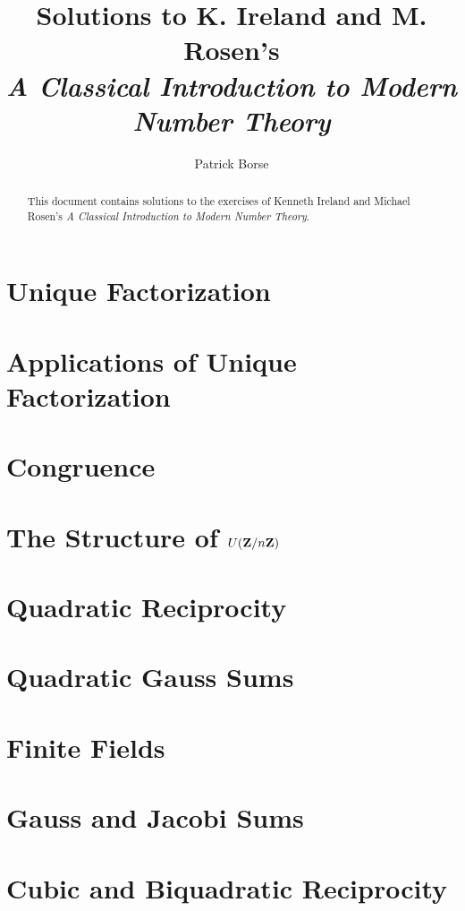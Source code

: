 \documentclass[oneside]{amsbook}
\title{Solutions to K. Ireland and M. Rosen's\\ \emph{A Classical Introduction to Modern Number Theory}}
\author{Patrick Borse}
\begin{document}
\begin{abstract}
This document contains solutions to the exercises of Kenneth Ireland and Michael Rosen's \emph{A Classical Introduction to Modern Number Theory}.
\end{abstract}

\maketitle

\tableofcontents

\chapter{Unique Factorization}


\chapter{Applications of Unique Factorization}


\chapter{Congruence}


\chapter{The Structure of $U(\mathbf{Z}/n\mathbf{Z})$}


\chapter{Quadratic Reciprocity}


\chapter{Quadratic Gauss Sums}


\chapter{Finite Fields}


\chapter{Gauss and Jacobi Sums}


\chapter{Cubic and Biquadratic Reciprocity}

\end{document}
